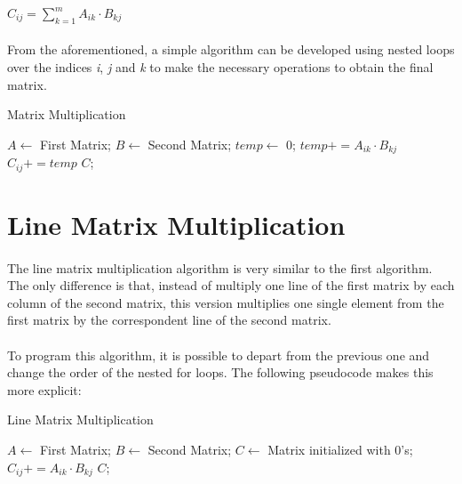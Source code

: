 \documentclass{report}
\begin{document}
			\begin{center}
				$C_{ij} = \sum_{k=1}^{m} A_{ik} \cdot B_{kj}$
			\end{center}
		
			\paragraph{} From the aforementioned, a simple algorithm can be developed using nested loops over the indices \emph{i}, \emph{j} and \emph{k} to make the necessary operations to obtain the final matrix.
			
			\begin{algorithm}[H]
				\caption{Matrix Multiplication} 
				\begin{algorithmic}[1]
					\State$A\gets $ First Matrix; $B\gets $ Second Matrix;
							\State $temp\gets $ 0;
								\State $temp += A_{ik} \cdot B_{kj}$
							\EndFor
							\State $C_{ij} += temp$
						\EndFor
					\EndFor
					\State\Return $C$;
				\end{algorithmic} 
			\end{algorithm}
		
		\section{Line Matrix Multiplication}
		
			\paragraph{} The line matrix multiplication algorithm is very similar to the first algorithm. The only difference is that, instead of multiply one line of the first matrix by each column of the second matrix, this version multiplies one single element from the first matrix by the correspondent line of the second matrix. 
			
			\paragraph{} To program this algorithm, it is possible to depart from the previous one and change the order of the nested for loops. The following pseudocode makes this more explicit:
			
			\begin{algorithm}[H]
				\caption{Line Matrix Multiplication} 
				\begin{algorithmic}[1]
					\State$A\gets $ First Matrix; $B\gets $ Second Matrix;
					\State$C\gets $ Matrix initialized with 0's;
								\State $C_{ij} += A_{ik} \cdot B_{kj}$
							\EndFor
						\EndFor
					\EndFor
					\State\Return $C$;
				\end{algorithmic} 
			\end{algorithm}
		
\end{document}
